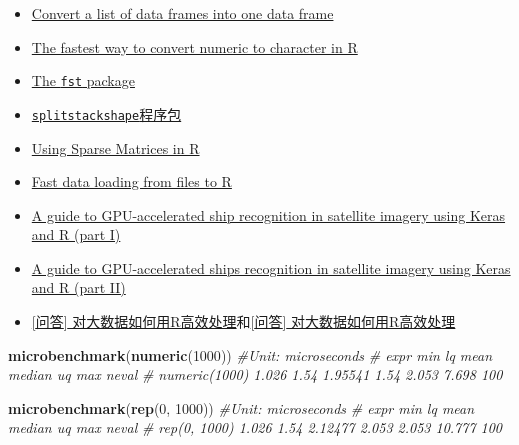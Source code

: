 \documentclass[]{book}
\newenvironment{Shaded}{\begin{snugshade}}{\end{snugshade}}
\newcommand{\KeywordTok}[1]{\textcolor[rgb]{0.13,0.29,0.53}{\textbf{#1}}}
\newcommand{\DecValTok}[1]{\textcolor[rgb]{0.00,0.00,0.81}{#1}}
\newcommand{\CommentTok}[1]{\textcolor[rgb]{0.56,0.35,0.01}{\textit{#1}}}
\newcommand{\NormalTok}[1]{#1}
\begin{document}
\begin{itemize}
\item
  \href{https://stackoverflow.com/questions/2851327/convert-a-list-of-data-frames-into-one-data-frame?rq=1}{Convert
  a list of data frames into one data frame}
\item
  \href{https://stackoverflow.com/questions/28447014/the-fastest-way-to-convert-numeric-to-character-in-r}{The
  fastest way to convert numeric to character in R}
\item
  \href{http://www.fstpackage.org/}{The \texttt{fst} package}
\item
  \href{https://d.cosx.org/d/420148-splitstackshape}{\texttt{splitstackshape}程序包}
\item
  \href{http://www.johnmyleswhite.com/notebook/2011/10/31/using-sparse-matrices-in-r/}{Using
  Sparse Matrices in R}
\item
  \href{https://appsilon.com/fast-data-loading-from-files-to-r/}{Fast
  data loading from files to R}
\item
  \href{https://appsilon.com/a-guide-to-gpu-accelerated-ship-recognition-in-satellite-imagery-using-keras-and-r-part-i/}{A
  guide to GPU-accelerated ship recognition in satellite imagery using
  Keras and R (part I)}
\item
  \href{https://appsilon.com/a-guide-to-gpu-accelerated-ships-recognition-in-satellite-imagery-using-keras-and-r-part-ii/}{A
  guide to GPU-accelerated ships recognition in satellite imagery using
  Keras and R (part II)}
\item
  \href{http://bbs.pinggu.org/forum.php?mod=redirect\&goto=findpost\&ptid=6685427\&pid=53936462\&fromuid=5794471}{{[}问答{]}
  对大数据如何用R高效处理}和\href{http://bbs.pinggu.org/forum.php?mod=redirect\&goto=findpost\&ptid=6685427\&pid=53936861\&fromuid=5794471}{{[}问答{]}
  对大数据如何用R高效处理}
\end{itemize}

\begin{Shaded}
\begin{Highlighting}[]
\KeywordTok{microbenchmark}\NormalTok{(}\KeywordTok{numeric}\NormalTok{(}\DecValTok{1000}\NormalTok{))}
\CommentTok{#Unit: microseconds}
\CommentTok{#          expr   min   lq    mean median    uq   max neval}
\CommentTok{# numeric(1000) 1.026 1.54 1.95541   1.54 2.053 7.698   100}

\KeywordTok{microbenchmark}\NormalTok{(}\KeywordTok{rep}\NormalTok{(}\DecValTok{0}\NormalTok{, }\DecValTok{1000}\NormalTok{))}
\CommentTok{#Unit: microseconds}
\CommentTok{#         expr   min   lq    mean median    uq    max neval}
\CommentTok{# rep(0, 1000) 1.026 1.54 2.12477  2.053 2.053 10.777   100}
\end{Highlighting}
\end{Shaded}
\end{document}
